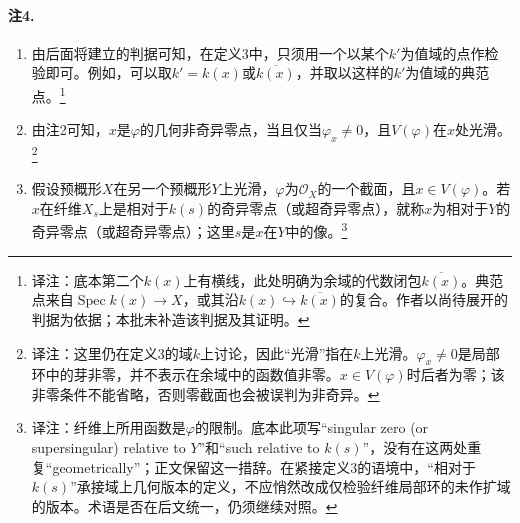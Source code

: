 \documentclass[openany,fontset=fandol]{ctexbook}
\newcommand{\note}[1]{\unskip\nobreak\footnote{译注：#1}}
\begin{document}
\paragraph{注4.}
\begin{enumerate}
\item[(a)] 由后面将建立的判据可知，在定义3中，只须用一个以某个$k'$为值域的点作检验即可。例如，可以取$k'=k(x)$或$\overline{k(x)}$，并取以这样的$k'$为值域的典范点。\note{底本第二个$k(x)$上有横线，此处明确为余域的代数闭包$\overline{k(x)}$。典范点来自$\operatorname{Spec}k(x)\to X$，或其沿$k(x)\hookrightarrow\overline{k(x)}$的复合。作者以尚待展开的判据为依据；本批未补造该判据及其证明。}
\item[(b)] 由注2可知，$x$是$\varphi$的几何非奇异零点，当且仅当$\varphi_x\ne0$，且$V(\varphi)$在$x$处光滑。\note{这里仍在定义3的域$k$上讨论，因此“光滑”指在$k$上光滑。$\varphi_x\ne0$是局部环中的芽非零，并不表示在余域中的函数值非零。$x\in V(\varphi)$时后者为零；该非零条件不能省略，否则零截面也会被误判为非奇异。}
\item[(c)] 假设预概形$X$在另一个预概形$Y$上光滑，$\varphi$为$\mathcal O_X$的一个截面，且$x\in V(\varphi)$。若$x$在纤维$X_s$上是相对于$k(s)$的奇异零点（或超奇异零点），就称$x$为相对于$Y$的奇异零点（或超奇异零点）；这里$s$是$x$在$Y$中的像。\note{纤维上所用函数是$\varphi$的限制。底本此项写“singular zero (or supersingular) relative to $Y$”和“such relative to $k(s)$”，没有在这两处重复“geometrically”；正文保留这一措辞。在紧接定义3的语境中，“相对于$k(s)$”承接域上几何版本的定义，不应悄然改成仅检验纤维局部环的未作扩域的版本。术语是否在后文统一，仍须继续对照。}
\end{enumerate}
\end{document}
